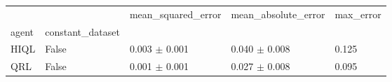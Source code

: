 \begin{tabular}{lllll}
\toprule
 &  & mean_squared_error & mean_absolute_error & max_error \\
agent & constant_dataset &  &  &  \\
\midrule
HIQL & False & 0.003 $\pm$ 0.001 & 0.040 $\pm$ 0.008 & 0.125 \\
\cline{1-5}
QRL & False & 0.001 $\pm$ 0.001 & 0.027 $\pm$ 0.008 & 0.095 \\
\cline{1-5}
\bottomrule
\end{tabular}
